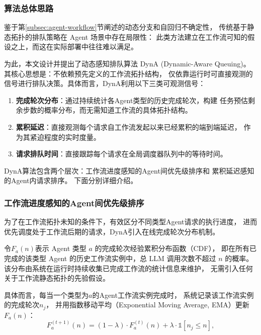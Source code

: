 \subsubsection{算法总体思路}\label{subsec:queue-overview}

鉴于第\ref{subsec:agent-workflow}节阐述的动态分支和自回归不确定性，
传统基于静态拓扑的排队策略在 Agent 场景中存在局限性：
此类方法建立在工作流可知的假设之上，而这在实际部署中往往难以满足。

为此，本文设计并提出了动态感知排队算法 DynA (Dynamic-Aware Queuing)。
其核心思想是：不依赖预先定义的工作流拓扑结构，
仅依靠运行时可直接观测的信号进行排队决策。具体而言，DynA利用以下三类可观测信号：
\begin{enumerate}
  \item \textbf{完成轮次分布}：通过持续统计各Agent类型的历史完成轮次，构建
        任务预估剩余步数的概率分布，而无需知道工作流的具体拓扑结构。
  \item \textbf{累积延迟}：直接观测每个请求自工作流发起以来已经累积的端到端延迟，
        作为其紧迫程度的实时度量。
  \item \textbf{请求排队时间}：直接跟踪每个请求在全局调度器队列中的等待时间。
\end{enumerate}

DynA算法包含两个层次：工作流进度感知的Agent间优先级排序和
累积延迟感知的Agent内请求排序。
下面分别详细介绍。

\subsubsection{工作流进度感知的Agent间优先级排序}\label{subsec:inter-agent}

为了在工作流拓扑未知的条件下，有效区分不同类型Agent请求的执行进度，
进而优先调度处于工作流后期的请求，DynA引入在线完成轮次分布机制。

令$F_a\left(n\right)$表示 Agent 类型 $a$ 的完成轮次经验累积分布函数（CDF），
即在所有已完成的该类型 Agent 的历史工作流实例中，总 LLM 调用次数不超过 $n$ 的概率。
该分布由系统在运行时持续收集已完成工作流的统计信息来维护，
无需引入任何关于工作流静态拓扑的先验假设。

具体而言，每当一个类型为$a$的Agent工作流实例完成时，
系统记录该工作流实例的完成轮次$n_j$，
并用指数移动平均（Exponential Moving Average, EMA）更新$F_a\left(n\right)$：
\begin{equation}\label{eq:ema-update}
  F_a^{(t+1)}\left(n\right) = \left(1 - \lambda\right) \cdot F_a^{(t)}\left(n\right) + \lambda \cdot \mathbb{1}\left[n_j \leq n\right],
\end{equation}


